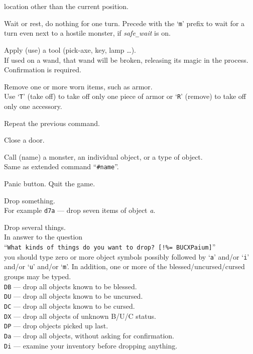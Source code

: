 location other than the current position.
\item[\tb{.}]
Wait or rest, do nothing for one turn.
Precede with the `{\tt m}' prefix
to wait for a turn even next to a hostile monster, if {\it safe\verb+_+wait\/}
is on.
\item[\tb{a}]
Apply (use) a tool (pick-axe, key, lamp \ldots).\\
If used on a wand, that wand will be broken, releasing its magic in the
process.
Confirmation is required.
\item[\tb{A}]
Remove one or more worn items, such as armor.\\
Use `{\tt T}' (take off) to take off only one piece of armor
or `{\tt R}' (remove) to take off only one accessory.
\item[\tb{\^{}A}]
Repeat the previous command.
\item[\tb{c}]
Close a door.
\item[\tb{C}]
Call (name) a monster, an individual object, or a type of object.\\
Same as extended command ``{\tt \#name}''.
\item[\tb{\^{}C}]
Panic button.  Quit the game.
\item[\tb{d}]
Drop something.\\
For example {\tt d7a} --- drop seven items of object
{\it a}.
\item[\tb{D}]
Drop several things.\\
In answer to the question\\
``{\tt What kinds of things do you want to drop? [!\%= BUCXPaium]}''\\
you should type zero or more object symbols possibly followed by
`{\tt a}' and/or `{\tt i}' and/or `{\tt u}' and/or `{\tt m}'.
In addition, one or more of
the bless\-ed/\-un\-curs\-ed/\-curs\-ed groups may be typed.\\
{\tt DB}  --- drop all objects known to be blessed.\\
{\tt DU}  --- drop all objects known to be uncursed.\\
{\tt DC}  --- drop all objects known to be cursed.\\
{\tt DX}  --- drop all objects of unknown B/U/C status.\\
{\tt DP}  --- drop objects picked up last.\\
{\tt Da}  --- drop all objects, without asking for confirmation.\\
{\tt Di}  --- examine your inventory before dropping anything.\\
